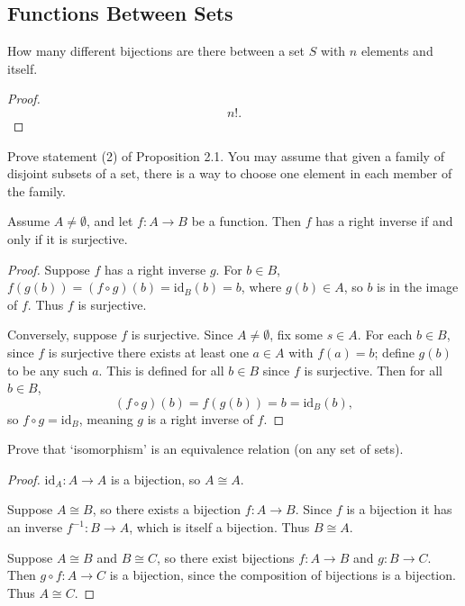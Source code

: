 \subsection{Functions Between Sets}

\begin{tcolorbox}[title=Problem 1, breakable]   
    How many different bijections are there between a set $S$ with $n$ elements and itself.
\end{tcolorbox}

\begin{proof}
    \[n!.\]
\end{proof}

\begin{tcolorbox}[title=Problem 2, breakable]   
    Prove statement (2) of Proposition 2.1. You may assume that given a family 
    of disjoint subsets of a set, there is a way to choose one element in each member of the family.
\end{tcolorbox}

\begin{theorem}[Proposition 2.1]
    Assume $A \ne \emptyset$, and let $f: A \longrightarrow B$ be a function. Then 
    $f$ has a right inverse if and only if it is surjective.
\end{theorem}

\begin{proof}
    Suppose $f$ has a right inverse $g$.
    For $b \in B$, $f(g(b)) = (f \circ g)(b) = \text{id}_B(b) = b$,
    where $g(b) \in A$, so $b$ is in the image of $f$.
    Thus $f$ is surjective.

    Conversely, suppose $f$ is surjective.
    Since $A \ne \emptyset$, fix some $s \in A$.
    For each $b \in B$, since $f$ is surjective there exists at least one $a \in A$ with $f(a) = b$;
    define $g(b)$ to be any such $a$.
    This is defined for all $b \in B$ since $f$ is surjective.
    Then for all $b \in B$,
    \[(f \circ g)(b) = f(g(b)) = b = \text{id}_B(b),\]
    so $f \circ g = \text{id}_B$, meaning $g$ is a right inverse of $f$.
\end{proof}


\begin{tcolorbox}[title=Problem 4, breakable]   
    Prove that `isomorphism' is an equivalence relation (on any set of sets).
\end{tcolorbox}

\begin{proof}
    $\text{id}_A : A \longrightarrow A$ is a bijection, so $A \cong A$.

    Suppose $A \cong B$, so there exists a bijection $f : A \longrightarrow B$.
    Since $f$ is a bijection it has an inverse $f^{-1} : B \longrightarrow A$, which is itself a bijection.
    Thus $B \cong A$.

    Suppose $A \cong B$ and $B \cong C$, so there exist bijections
    $f : A \longrightarrow B$ and $g : B \longrightarrow C$.
    Then $g \circ f : A \longrightarrow C$ is a bijection, since the composition of bijections is a bijection.
    Thus $A \cong C$.
\end{proof}


